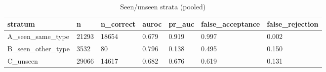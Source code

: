 \begin{table}[t]
\centering
\small
\begin{tabular}{lllllll}
\hline
stratum & n & n\_correct & auroc & pr\_auc & false\_acceptance & false\_rejection \\
\hline
A\_seen\_same\_type & 21293 & 18654 & 0.679 & 0.919 & 0.997 & 0.002 \\
B\_seen\_other\_type & 3532 & 80 & 0.796 & 0.138 & 0.495 & 0.150 \\
C\_unseen & 29066 & 14617 & 0.682 & 0.676 & 0.619 & 0.131 \\
\hline
\end{tabular}
\caption{Seen/unseen strata (pooled)}
\label{tab:strata_pooled}
\end{table}
